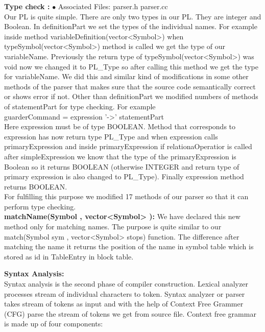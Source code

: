 \documentclass[paper=letter, fontsize=12pt]{scrartcl} %
\begin{document}
{\bf Type check :}      
$\bullet$ Associated Files: parser.h parser.cc\\
Our PL is quite simple. There are only two types in our PL. They are integer and Boolean. In definitionPart we set the types of the individual names. For example inside method variableDefinition(vector<Symbol>) when typeSymbol(vector<Symbol>) method is  called we get the type of our variableName. Previously the return type of typeSymbol(vector<Symbol>) was void now we changed it to PL\_Type so after calling this method we get the type for variableName. We did this and similar kind of modifications in some other methods of the parser that makes sure that the source code semantically correct or shows error if not. Other than definitionPart we modified numbers of methods of statementPart for type checking. For example\\

guarderCommand = expression '->' statementPart\\

Here expression must be of type BOOLEAN. Method that corresponds to expression has now return type PL\_Type and when expression calls primaryExpression and inside primaryExpression if relationaOperatior is called after simpleExpression we know that the type of the primaryExpression is Boolean so it returns BOOLEAN (otherwise INTEGER and return type of primary expression is also changed to PL\_Type). Finally expression method returns BOOLEAN. \\
For fulfilling this purpose we modified 17 methods of our parser so that it can perform type checking.\\

{\bf matchName(Symbol , vector<Symbol> ):}
We have declared this new method only for matching names. The purpose is quite similar to our match(Symbol sym , vector<Symbol> stops) function. The difference after matching the name it returns the position of the name in symbol table which is stored as id in TableEntry in block table.           

\pagebreak

{\bf {\huge Syntax Analysis:}}\\
Syntax analysis is the second phase of compiler construction. Lexical analyzer processes stream of individual characters to token. Syntax analyzer or parser takes stream of tokens as input and with the help of Context Free Grammer (CFG) parse the stream of tokens we get from source file. Context free grammar is made up of four components:
\end{document}
